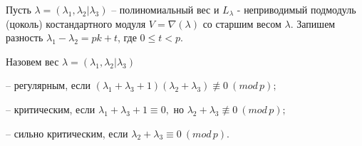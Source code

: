 Пусть $ \lambda = (\lambda_1, \lambda_2 | \lambda_3) $ -- полиномиальный вес и $L_{\lambda}$ - неприводимый подмодуль (цоколь) костандартного модуля $V = \nabla(\lambda)$ со старшим весом $\lambda$. Запишем разность $ \lambda_1 - \lambda_2 = pk + t $, где $ 0 \leq t < p $.

\begin{definition}
Назовем вес $ \lambda = (\lambda_1, \lambda_2 | \lambda_3) $

-- регулярным, если $ (\lambda_1 + \lambda_3 + 1)(\lambda_2 + \lambda_3) \not\equiv 0 ~(mod\,p); $

-- критическим, если $ \lambda_1 + \lambda_3 + 1 \equiv 0, \mbox{ но } \lambda_2 + \lambda_3 \not\equiv 0 ~(mod\,p); $

-- сильно критическим, если $ \lambda_2 + \lambda_3 \equiv 0 ~(mod\,p). $
\end{definition}



%
